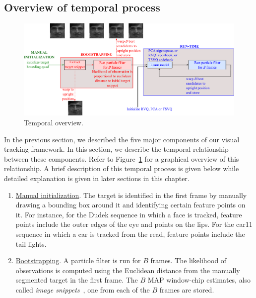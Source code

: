 \begin{Body}
\begin{enumerate}
\end{enumerate}

\subsection{Overview of temporal process}
								\begin{figure}[t]
								\centering
								\includegraphics[width=1.1\textwidth]{thesis/PhD_experimentalTemporalOverview.pdf}
								\caption{Temporal overview.}
								\label{fig:temporal_overview}
								\end{figure}

In the previous section, we described the five major components of our visual tracking framework.  In this section, we describe the temporal relationship between these components.  Refer to Figure~\ref{fig:temporal_overview} for a graphical overview of this relationship.  A brief description of this temporal process is given below while detailed explanation is given in later sections in this chapter.

\begin{enumerate}
\item \underline{Manual initialization}.  The target is identified in the first frame by manually drawing a bounding box around it and identifying certain feature points on it.  For instance, for the Dudek sequence in which a face is tracked, feature points include the outer edges of the eye and points on the lips.  For the car11 sequence in which a car is tracked from the read, feature points include the tail lights.


\item \underline{Bootstrapping}.  A particle filter is run for $B$ frames.  The likelihood of observations is computed using the Euclidean distance from the manually segmented target in the first frame.  The $B$ MAP window-chip estimates, also called \emph{image snippets}~\cite{2007_JNL_IDDM_Barnes}, one from each of the $B$ frames are stored.


\end{enumerate}
\end{Body}
